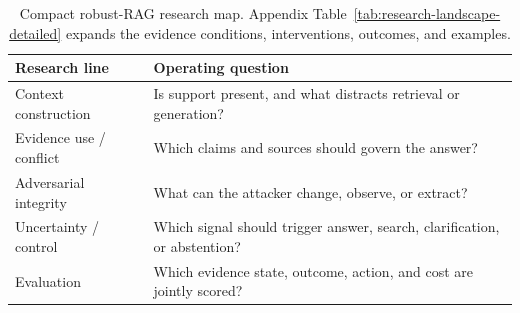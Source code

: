\begin{table}[t]
\centering
\small
\setlength{\tabcolsep}{3pt}
\renewcommand{\arraystretch}{0.95}
\begin{tabularx}{\columnwidth}{>{\raggedright\arraybackslash}p{}X}
\toprule
\textbf{Research line} & \textbf{Operating question} \\
\midrule
Context construction & Is support present, and what distracts retrieval or generation? \\
Evidence use / conflict & Which claims and sources should govern the answer? \\
Adversarial integrity & What can the attacker change, observe, or extract? \\
Uncertainty / control & Which signal should trigger answer, search, clarification, or abstention? \\
Evaluation & Which evidence state, outcome, action, and cost are jointly scored? \\
\bottomrule
\end{tabularx}
\caption{Compact robust-RAG research map. Appendix Table~\ref{tab:research-landscape-detailed} expands the evidence conditions, interventions, outcomes, and examples.}
\label{tab:main-research-landscape}
\end{table}

